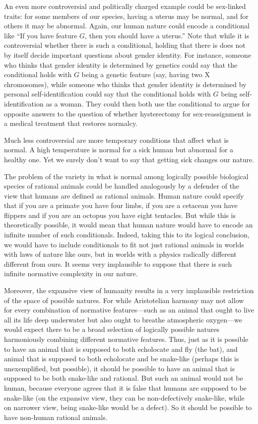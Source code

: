 An even more controversial and politically charged example could be sex-linked traits: for some members of our species, having a uterus may be normal, and for others
it may be abnormal. Again, our human nature could encode a conditional like ``If you have feature $G$, then you should have a uterus.''
Note that while it is controversial whether there is such a conditional, holding that there is does not by itself decide important questions about gender identity.
For instance, someone who thinks that gender identity is determined by genetics could say that the conditional holds with $G$ being a genetic
feature (say, having two X chromosomes), while someone who thinks that gender identity is determined by personal self-identification could say
that the conditional holds with $G$ being self-identification as a woman. They could then both use the conditional to argue for opposite answers
to the question of whether hysterectomy for sex-reassignment is a medical treatment that restores normalcy.

Much less controversial are more temporary conditions that affect what is normal. A high temperature is normal for a sick human but abnormal for a
healthy one. Yet we surely don't want to say that getting sick changes our nature.

The problem of the variety in what is normal among logically possible biological species of rational animals could be handled analogously
by a defender of the view that humans are defined as rational animals. 
Human nature could specify that if you are a primate you have four limbs, if you are a cetacean you have flippers and if you are an octopus you have
eight tentacles. But while this is theoretically possible, it would mean that human nature would have to encode an infinite number of such conditionals.
Indeed, taking this to its logical conclusion, we would have to include conditionals to fit not just rational animals in worlds with laws of nature like ours,
but in worlds with a physics radically different different from ours. It seems very implausible to suppose that there is such infinite normative complexity
in our nature.

Moreover, the expansive view of humanity results in a very implausible restriction of the space of possible natures. For while Aristotelian harmony may not
allow for every combination of normative features---such as an animal that ought to live all its life deep underwater but also ought to breathe atmospheric 
oxygen---we would expect there to be a broad selection of logically possible natures harmoniously combining different normative features. Thus, just as it
is possible to have an animal that is supposed to both echolocate and fly (the bat), and animal that is supposed to both echolocate and be snake-like (perhaps
this is unexemplified, but possible), it should
be possible to have an animal that is supposed to be both snake-like and rational. But such an animal would not be human, because everyone 
agrees that it is false that humans are supposed
to be snake-like (on the expansive view, they can be non-defectively snake-like, while on narrower view, being snake-like would be a defect). So 
it should be possible to have non-human rational animals.


